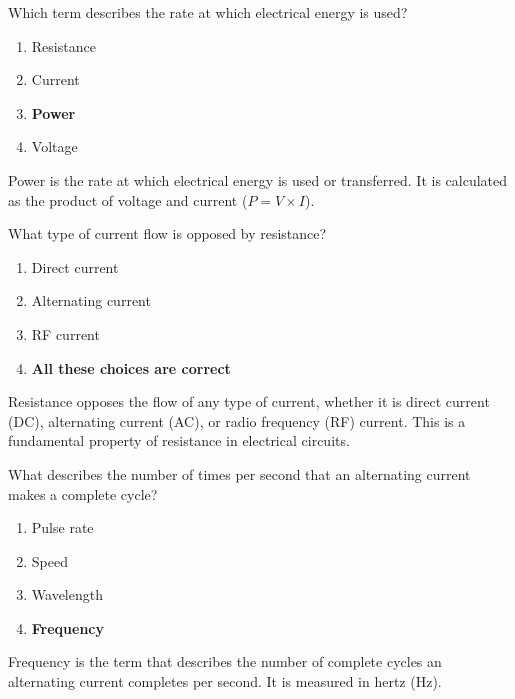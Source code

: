 \begin{tcolorbox}[colback=gray!10!white,colframe=black!75!black,title={T5A10}]
    Which term describes the rate at which electrical energy is used?
    \begin{enumerate}[label=\Alph*),noitemsep]
        \item Resistance
        \item Current
        \item \textbf{Power}
        \item Voltage
    \end{enumerate}
\end{tcolorbox}
Power is the rate at which electrical energy is used or transferred. It is calculated as the product of voltage and current (\( P = V \times I \)).


\begin{tcolorbox}[colback=gray!10!white,colframe=black!75!black,title={T5A11}]
    What type of current flow is opposed by resistance?
    \begin{enumerate}[label=\Alph*),noitemsep]
        \item Direct current
        \item Alternating current
        \item RF current
        \item \textbf{All these choices are correct}
    \end{enumerate}
\end{tcolorbox}
Resistance opposes the flow of any type of current, whether it is direct current (DC), alternating current (AC), or radio frequency (RF) current. This is a fundamental property of resistance in electrical circuits.


\begin{tcolorbox}[colback=gray!10!white,colframe=black!75!black,title={T5A12}]
    What describes the number of times per second that an alternating current makes a complete cycle?
    \begin{enumerate}[label=\Alph*),noitemsep]
        \item Pulse rate
        \item Speed
        \item Wavelength
        \item \textbf{Frequency}
    \end{enumerate}
\end{tcolorbox}
Frequency is the term that describes the number of complete cycles an alternating current completes per second. It is measured in hertz (Hz).

